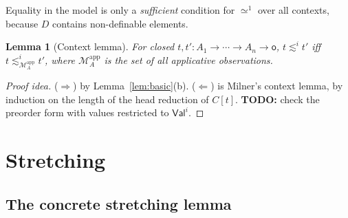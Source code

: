 \documentclass[11pt]{article}
\newcommand{\Ground}{\mathsf{o}\xspace}
\newcommand{\Val}{\mathsf{Val}\xspace}
\newcommand{\ObsEq}{\mathrel{\simeq}\xspace}
\newcommand{\ObsLeq}{\mathrel{\lesssim}\xspace}
\newtheorem{lemma}[theorem]{Lemma}
\theoremstyle{definition}
\begin{document}
Equality in the model is only a \emph{sufficient} condition for
$\ObsEq^1$ over all contexts, because $D$ contains non-definable elements.

\begin{lemma}[Context lemma]\label{lem:context}
For closed $t,t':A_1\to\cdots\to A_n\to\Ground$,
$t\ObsLeq^i t'$ iff $t\ObsLeq^i_{\mathcal M^{\mathrm{app}}_A}t'$, where
$\mathcal M^{\mathrm{app}}_A$ is the set of all applicative observations.
\end{lemma}
\begin{proof}[Proof idea]
($\Rightarrow$) by Lemma~\ref{lem:basic}(b).  ($\Leftarrow$) is Milner's
context lemma, by induction on the length of the head reduction of
$C[t]$.  \textbf{TODO:} check the preorder form with values restricted to
$\Val^i$.
\end{proof}

\section{Stretching}\label{sec:stretch}

\subsection{The concrete stretching lemma}
\end{document}
